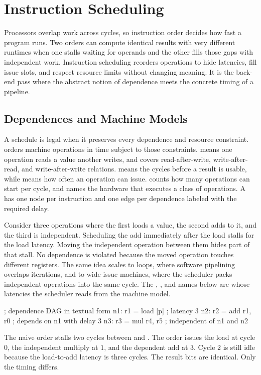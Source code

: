 \chapter{Instruction Scheduling}\label{ch:instruction-scheduling}

Processors overlap work across cycles, so instruction order decides how fast a program runs.
Two orders can compute identical results with very different runtimes when one stalls waiting for operands and the other fills those gaps with independent work.
Instruction scheduling reorders operations to hide latencies, fill issue slots, and respect resource limits without changing meaning.
It is the back-end pass where the abstract notion of dependence meets the concrete timing of a pipeline.

\section{Dependences and Machine Models}\label{sec:ch26-dependences}

A schedule is legal when it preserves every dependence and resource constraint.
 orders machine operations in time subject to those constraints.
 means one operation reads a value another writes, and covers read-after-write, write-after-read, and write-after-write relations.
 means the cycles before a result is usable, while  means how often an operation can issue.
 counts how many operations can start per cycle, and  names the hardware that executes a class of operations.
A  has one node per instruction and one edge per dependence labeled with the required delay.

Consider three operations where the first loads a value, the second adds to it, and the third is independent.
Scheduling the add immediately after the load stalls for the load latency.
Moving the independent operation between them hides part of that stall.
No dependence is violated because the moved operation touches different registers.
The same idea scales to loops, where software pipelining overlaps iterations, and to wide-issue machines, where the scheduler packs independent operations into the same cycle.
The , , and  names below are  whose latencies the scheduler reads from the machine model.
\begin{irlisting}
; dependence DAG in textual form
n1: r1 = load [p]      ; latency 3
n2: r2 = add r1, r0    ; depends on n1 with delay 3
n3: r3 = mul r4, r5    ; independent of n1 and n2
\end{irlisting}
The naive order  stalls two cycles between  and .
The order  issues the load at cycle $0$, the independent multiply at $1$, and the dependent add at $3$.
Cycle $2$ is still idle because the load-to-add latency is three cycles.
The result bits are identical.
Only the timing differs.

